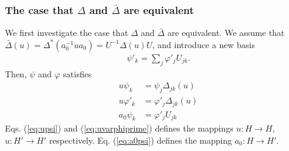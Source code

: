 \documentclass{article}
\begin{document}
\subsubsection{The case that $\Delta$ and $\bar{\Delta}$ are equivalent}
We first investigate the case that $\Delta$ and $\bar{\Delta}$ are equivalent.
We assume that $\bar{\Delta}(u) = \Delta^*(a_0^{-1} u a_0) = U^{-1} \Delta(u) U$, and introduce a new basis
\begin{align}
  \psi'_k = \sum_j \varphi'_j U_{jk}.
\end{align}
Then, $\psi$ and $\varphi$ satisfies
\begin{align}
  u \psi_k &= \psi_j \Delta_{jk} (u)
  \label{eq:upsi}
  \\
  u \varphi'_k &= \varphi'_j \Delta_{jk}(u)
  \label{eq:uvarphiprime}
  \\
  a_0 \psi_k &= \varphi'_j U_{jk}
  \label{eq:a0psi}
\end{align}
Eqs. (\ref{eq:upsi}) and (\ref{eq:uvarphiprime}) defines the mappings $u: H \to H$, $u: H' \to H'$ respectively.
Eq. (\ref{eq:a0psi}) defines the mapping $a_0: H\to H'$.
\end{document}
